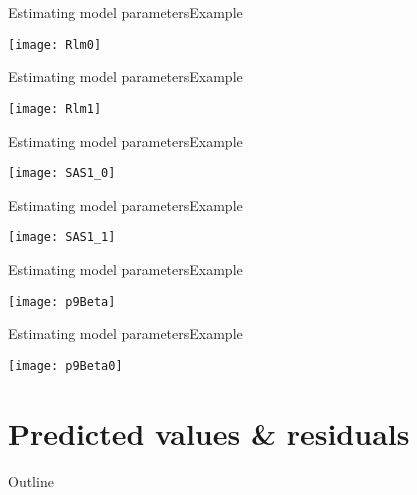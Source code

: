 \documentclass[xcolor=dvipsnames]{beamer}
\begin{document}
\begin{frame}{Estimating model parameters}{Example}
	\begin{center}
		\texttt{[image: Rlm0]}
	\end{center}
\end{frame}

\begin{frame}{Estimating model parameters}{Example}
	\begin{center}
		\texttt{[image: Rlm1]}
	\end{center}
\end{frame}

\begin{frame}{Estimating model parameters}{Example}
	\begin{center}
		\texttt{[image: SAS1\_0]}
	\end{center}
\end{frame}

\begin{frame}{Estimating model parameters}{Example}
	\begin{center}
		\texttt{[image: SAS1\_1]}
	\end{center}
\end{frame}

\begin{frame}{Estimating model parameters}{Example}
	\begin{center}
		\texttt{[image: p9Beta]}
	\end{center}
\end{frame}

\begin{frame}{Estimating model parameters}{Example}
\begin{center}
	\texttt{[image: p9Beta0]}
\end{center}
\end{frame}

\section{Predicted values \& residuals}
\begin{frame}{Outline}
\tableofcontents[currentsection,subsectionstyle=show/shaded/hide]
\end{frame}
\end{document}
